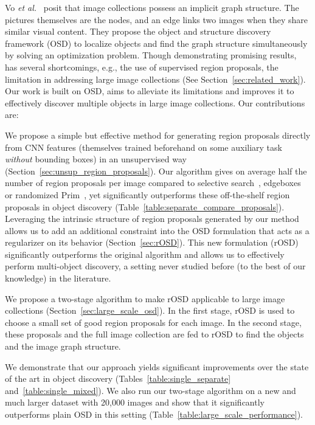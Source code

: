 \documentclass[runningheads]{llncs}
\begin{document}
Vo {\em et al.}~\cite{Vo2019UnsupOptim} posit that image collections possess an implicit graph structure.
The pictures themselves are the nodes, and an edge links two images when they share similar visual content. They propose the object and structure discovery framework (OSD) to localize objects and find the graph structure simultaneously by solving an optimization problem. Though demonstrating promising results,~\cite{Vo2019UnsupOptim} has several shortcomings, e.g., the use of supervised region proposals, the limitation in addressing large image collections (See Section~\ref{sec:related_work}). Our work is built on OSD, aims to alleviate its limitations and improves it to effectively discover multiple objects in large image collections. Our contributions are:

\indent{} We propose a simple but effective method for generating region proposals directly from CNN features (themselves trained beforehand on some auxiliary task~\cite{Symonian2014verydeep} {\em without} bounding boxes) in an unsupervised way (Section~\ref{sec:unsup_region_proposals}). Our algorithm gives on average half the number of region proposals per image compared to selective search~\cite{uijlings2013selective}, edgeboxes~\cite{zitnick2014edge} or randomized Prim~\cite{Manen2013prim}, yet significantly outperforms these off-the-shelf region proposals in object discovery (Table~\ref{table:separate_compare_proposals}). 
\indent{} Leveraging the intrinsic structure of region proposals generated by our method allows us to add an additional constraint into the OSD formulation that acts as a regularizer on its behavior (Section~\ref{sec:rOSD}). This new formulation (rOSD) significantly outperforms the original algorithm and allows us to effectively perform multi-object discovery, a setting never studied before (to the best of our knowledge) in the literature.

\indent{} We propose a two-stage algorithm to make rOSD applicable to large image collections (Section~\ref{sec:large_scale_osd}). In the first stage, rOSD is used to choose a small set of good region proposals for each image. In the second stage, these proposals and the full image collection are fed to rOSD to find the objects and the image graph structure.

\indent{} We demonstrate that our approach yields significant improvements over the state of the art in object discovery (Tables~\ref{table:single_separate} and~\ref{table:single_mixed}). We also run our two-stage algorithm on a new and much larger dataset with 20,000 images and show that it significantly outperforms plain OSD in this setting (Table~\ref{table:large_scale_performance}).
\end{document}
